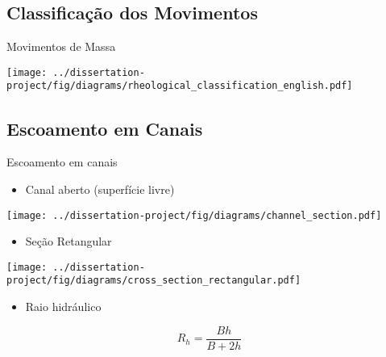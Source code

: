 \subsection{Classificação dos Movimentos}

\begin{frame}{Movimentos de Massa}
    \begin{minipage}[c]{0.70\textwidth}
        \centering
        \texttt{[image: ../dissertation-project/fig/diagrams/rheological\_classification\_english.pdf]}
    \end{minipage}
    \hfill    
    \begin{minipage}[c]{0.28\textwidth}
    \end{minipage}
\end{frame}


\subsection{Escoamento em Canais}

\begin{frame}{Escoamento em canais}
    \begin{itemize}
        \item Canal aberto (superfície livre)
    \end{itemize}    
    \begin{minipage}[c]{0.50\textwidth}
        \centering
        \texttt{[image: ../dissertation-project/fig/diagrams/channel\_section.pdf]}
    \end{minipage}
    \hfill
    \pause
    \begin{minipage}[c]{0.36\textwidth}
        \begin{itemize}
            \item Seção Retangular
        \end{itemize}
            \vspace{0.25cm}
            \centering
            \texttt{[image: ../dissertation-project/fig/diagrams/cross\_section\_rectangular.pdf]}
        \vspace{0.50cm}
        
        \begin{itemize}
            \item Raio hidráulico
        \end{itemize}
        \vspace{0.25cm}
        \begin{equation}
            R_h = \frac{Bh}{B+2h}
        \end{equation}
    \end{minipage}
\end{frame}

